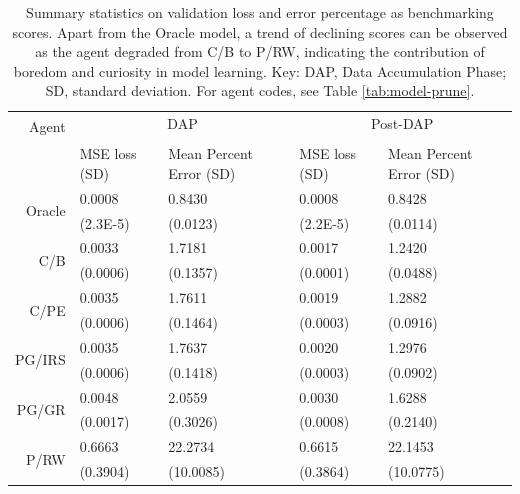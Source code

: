 \documentclass[utf8]{frontiersSCNS}
\begin{document}
\begin{table}[bh!]
	\begin{center}
	\caption{Summary statistics on validation loss and error percentage as benchmarking scores. Apart from the Oracle model, a trend of declining scores can be observed as the agent degraded from C/B to P/RW, indicating the contribution of boredom and curiosity in model learning. Key: DAP, Data Accumulation Phase; SD, standard deviation. For agent codes, see Table \ref{tab:model-prune}.}
	\label{tab:vldprogress}
	\begin{tabular}{r l p{2.3cm} | l p{2.3cm}}
	\toprule
	\multirow{2}{*}{Agent} & \multicolumn{2}{c}{DAP} & \multicolumn{2}{c}{Post-DAP} \\
	\cline{2-5} \\
	& MSE loss (SD) & Mean Percent Error (SD) & MSE loss (SD) & Mean Percent Error (SD) \\
	\midrule
	\multirow{2}{*}{Oracle}
			 & 0.0008   & 0.8430   & 0.0008   & 0.8428   \\
		     & (2.3E-5) & (0.0123) & (2.2E-5) & (0.0114) \\
	\multirow{2}{*}{C/B}
			 & 0.0033   & 1.7181   & 0.0017   & 1.2420   \\
			 & (0.0006) & (0.1357) & (0.0001) & (0.0488) \\
	\multirow{2}{*}{C/PE}
			 & 0.0035   & 1.7611   & 0.0019   & 1.2882   \\	
			 & (0.0006) & (0.1464) & (0.0003) & (0.0916) \\
	\multirow{2}{*}{PG/IRS}
			 & 0.0035   & 1.7637   & 0.0020   & 1.2976   \\
			 & (0.0006) & (0.1418) & (0.0003) & (0.0902) \\
	\multirow{2}{*}{PG/GR}
			 & 0.0048   & 2.0559   & 0.0030   & 1.6288   \\
			 & (0.0017) & (0.3026) & (0.0008) & (0.2140) \\
	\multirow{2}{*}{P/RW}
			 & 0.6663   & 22.2734   & 0.6615   & 22.1453   \\
			 & (0.3904) & (10.0085) & (0.3864) & (10.0775) \\
	\bottomrule
	\end{tabular}
	\end{center}
\end{table}
\end{document}
